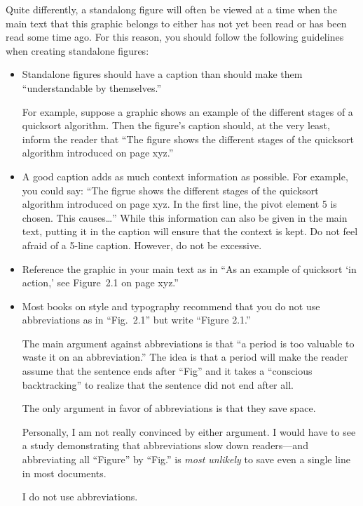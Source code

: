 Quite differently, a standalong figure will often be viewed at a time
when the main text that this graphic belongs to either has not yet
been read or has been read some time ago. For this reason, you should
follow the following guidelines when creating standalone figures:
\begin{itemize}
\item
  Standalone figures should have a caption than should make them
  ``understandable by themselves.''

  For example, suppose a graphic shows an example of the different
  stages of a quicksort algorithm. Then the figure's caption should,
  at the very least, inform the reader that ``The figure shows the
  different stages of the quicksort algorithm introduced on page
  xyz.''
\item
  A good caption adds as much context information as possible. For
  example, you could say: ``The figrue shows the different stages of
  the quicksort algorithm introduced on page xyz. In the first line,
  the pivot element 5 is chosen. This causes\dots'' While this
  information can also be given in the main text, putting it in the
  caption will ensure that the context is kept. Do not feel afraid of
  a 5-line caption. However, do not be excessive.
\item
  Reference the graphic in your main text as in ``As an example of
  quicksort `in action,' see Figure~2.1 on page xyz.''
\item
  Most books on style and typography recommend that you do not use
  abbreviations as in ``Fig.~2.1'' but write ``Figure 2.1.''

  The main argument against abbreviations is that ``a period is too
  valuable to waste it on an abbreviation.'' The idea is that a period
  will make the reader assume that the sentence ends after ``Fig'' and
  it takes a ``conscious backtracking'' to realize that the sentence
  did not end after all.

  The only argument in favor of abbreviations is that they save
  space.
  
  Personally, I am not really convinced by either argument. I would
  have to see a study demonstrating that abbreviations slow down
  readers---and abbreviating all ``Figure'' by ``Fig.'' is \emph{most
    unlikely} to save even a single line in most documents.

  I do not use abbreviations.
\end{itemize}



